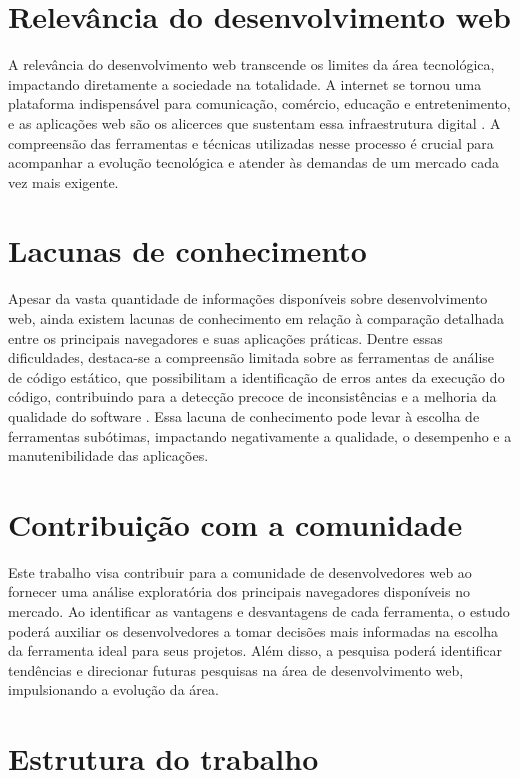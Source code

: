 \section{Relevância do desenvolvimento web}
A relevância do desenvolvimento web transcende os limites da área tecnológica, impactando diretamente a sociedade na totalidade. A internet se tornou uma plataforma indispensável para comunicação, comércio, educação e entretenimento, e as aplicações web são os alicerces que sustentam essa infraestrutura digital \cite{tecnologia-web}. A compreensão das ferramentas e técnicas utilizadas nesse processo é crucial para acompanhar a evolução tecnológica e atender às demandas de um mercado cada vez mais exigente.

\section{Lacunas de conhecimento}
Apesar da vasta quantidade de informações disponíveis sobre desenvolvimento web, ainda existem lacunas de conhecimento em relação à comparação detalhada entre os principais navegadores e suas aplicações práticas. Dentre essas dificuldades, destaca-se a compreensão limitada sobre as ferramentas de análise de código estático, que possibilitam a identificação de erros antes da execução do código, contribuindo para a detecção precoce de inconsistências e a melhoria da qualidade do software \cite{odell_2014_pro}. Essa lacuna de conhecimento pode levar à escolha de ferramentas subótimas, impactando negativamente a qualidade, o desempenho e a manutenibilidade das aplicações.

\section{Contribuição com a comunidade}
Este trabalho visa contribuir para a comunidade de desenvolvedores web ao fornecer uma análise exploratória dos principais navegadores disponíveis no mercado. Ao identificar as vantagens e desvantagens de cada ferramenta, o estudo poderá auxiliar os desenvolvedores a tomar decisões mais informadas na escolha da ferramenta ideal para seus projetos. Além disso, a pesquisa poderá identificar tendências e direcionar futuras pesquisas na área de desenvolvimento web, impulsionando a evolução da área.




\section{Estrutura do trabalho}
\label{sec:estruturaTrabalho}

